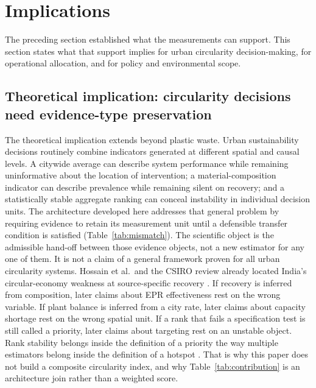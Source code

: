 \documentclass[12pt,a4paper]{article}
\begin{document}
\section{Implications}
\label{sec:implications}

The preceding section established what the measurements can support. This section states what that support implies for urban circularity decision-making, for operational allocation, and for policy and environmental scope.

\subsection{Theoretical implication: circularity decisions need evidence-type preservation}

The theoretical implication extends beyond plastic waste. Urban sustainability decisions routinely combine indicators generated at different spatial and causal levels. A citywide average can describe system performance while remaining uninformative about the location of intervention; a material-composition indicator can describe prevalence while remaining silent on recovery; and a statistically stable aggregate ranking can conceal instability in individual decision units. The architecture developed here addresses that general problem by requiring evidence to retain its measurement unit until a defensible transfer condition is satisfied (Table~\ref{tab:mismatch}). The scientific object is the admissible hand-off between those evidence objects, not a new estimator for any one of them. It is not a claim of a general framework proven for all urban circularity systems. Hossain et al.\ and the CSIRO review already located India's circular-economy weakness at source-specific recovery \citep{haque_plastic_waste_india_2022,csiro_ce_policy_india_2021}. If recovery is inferred from composition, later claims about EPR effectiveness rest on the wrong variable. If plant balance is inferred from a city rate, later claims about capacity shortage rest on the wrong spatial unit. If a rank that fails a specification test is still called a priority, later claims about targeting rest on an unstable object. Rank stability belongs inside the definition of a priority the way multiple estimators belong inside the definition of a hotspot \citep{ieam_kota_landuse_msw_2026,belton_stewart_2002,saltelli_sensitivity_2008}. That is why this paper does not build a composite circularity index, and why Table~\ref{tab:contribution} is an architecture join rather than a weighted score.
\end{document}
